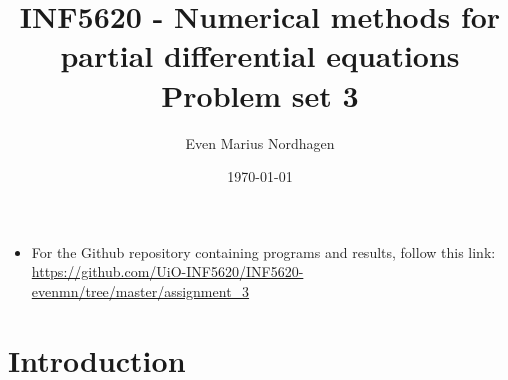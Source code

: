 \documentclass[norsk,a4paper,12pt]{article}
\title{INF5620 - Numerical methods for partial differential equations\\\vspace{2mm} \Large{Problem set 3}}
\author{\large Even Marius Nordhagen}
\date\today
\begin{document}
\maketitle

\begin{itemize}
\item For the Github repository containing programs and results, follow this link: 
\url{https://github.com/UiO-INF5620/INF5620-evenmn/tree/master/assignment_3}
\end{itemize}

\section{Introduction}


\end{document}

